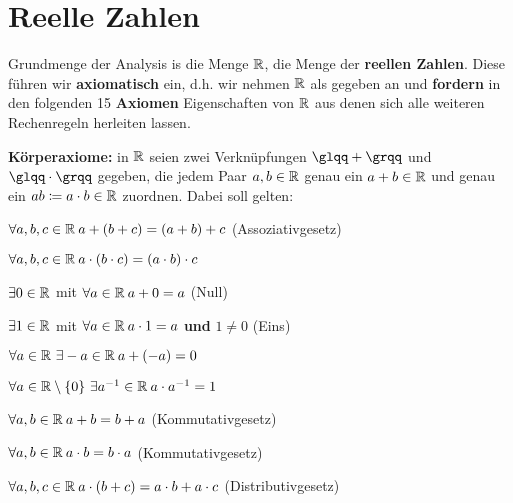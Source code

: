 \section{Reelle Zahlen}


Grundmenge der Analysis is die Menge $\mathbb{R}$, die Menge der \textbf{reellen Zahlen}. Diese führen wir \textbf{axiomatisch} ein, d.h. wir nehmen $\mathbb{R}$ als gegeben an und \textbf{fordern} in den folgenden 15 \textbf{Axiomen} Eigenschaften von $\mathbb{R}$ aus denen sich alle weiteren Rechenregeln herleiten lassen.
\newline

\textbf{Körperaxiome:} in $\mathbb{R}$ seien zwei Verknüpfungen $\glqq + \grqq$ und $\glqq \cdot \grqq$ gegeben, die jedem Paar $a, b \in \mathbb{R}$ genau ein $a + b \in \mathbb{R}$ und genau ein $a b \coloneqq a \cdot b \in \mathbb{R}$ zuordnen. Dabei soll gelten:


\begin{description} \label{k.axiom}
	\label{k.axiom-a1}
	\item[\hspace{0.4cm}$(A1)$] $\forall a, b, c \in \mathbb{R} \: a + \left( b + c \right) = \left( a + b \right) + c$  (Assoziativgesetz)
	\label{k.axiom-a5}
	\item[\hspace{0.4cm}$(A5)$] $\forall a, b, c \in \mathbb{R} \: a \cdot \left( b \cdot c \right) = \left( a \cdot b \right) \cdot c$
	\label{k.axiom-a2}
	\item[\hspace{0.4cm}$(A2)$] $\exists 0 \in \mathbb{R}$ mit $\forall a \in \mathbb{R} \: a + 0 = a$ (Null)
	\label{k.axiom-a6}
	\item[\hspace{0.4cm}$(A6)$] $\exists 1 \in \mathbb{R}$ mit $\forall a \in \mathbb{R} \: a \cdot 1 = a$ \textbf{und} $1 \neq 0$ (Eins)
	\label{k.axiom-a3}
	\item[\hspace{0.4cm}$(A3)$] $\forall a \in \mathbb{R} ~ \exists -a \in \mathbb{R} \: a + (-a) = 0$
	\label{k.axiom-a7}
	\item[\hspace{0.4cm}$(A7)$] $\forall a \in \mathbb{R} \setminus \{ 0 \} ~ \exists a^{-1} \in \mathbb{R} \: a \cdot a^{-1} = 1$
	\label{k.axiom-a4}
	\item[\hspace{0.4cm}$(A4)$] $\forall a, b \in \mathbb{R} \: a + b = b + a$ (Kommutativgesetz)
	\label{k.axiom-a8}
	\item[\hspace{0.4cm}$(A8)$] $\forall a, b \in \mathbb{R} \: a \cdot b = b \cdot a$ (Kommutativgesetz)
	\label{k.axiom-a9}
	\item[\hspace{0.4cm}$(A9)$] $\forall a, b, c \in \mathbb{R} \: a \cdot (b + c) = a \cdot b + a \cdot c$ (Distributivgesetz)
\end{description}


